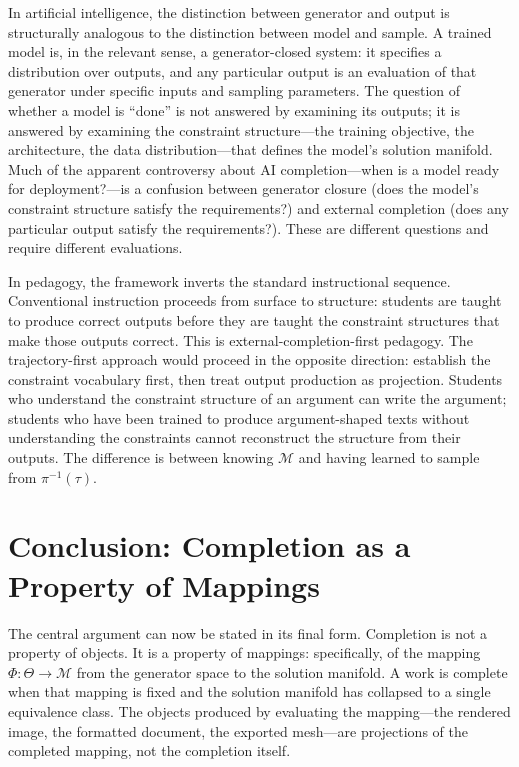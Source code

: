 \documentclass[12pt, twoside]{article}
\theoremstyle{plain}
\theoremstyle{definition}
\theoremstyle{remark}
\begin{document}
In artificial intelligence, the distinction between generator and output is structurally analogous to the distinction between model and sample. A trained model is, in the relevant sense, a generator-closed system: it specifies a distribution over outputs, and any particular output is an evaluation of that generator under specific inputs and sampling parameters. The question of whether a model is ``done'' is not answered by examining its outputs; it is answered by examining the constraint structure---the training objective, the architecture, the data distribution---that defines the model's solution manifold. Much of the apparent controversy about AI completion---when is a model ready for deployment?---is a confusion between generator closure (does the model's constraint structure satisfy the requirements?) and external completion (does any particular output satisfy the requirements?). These are different questions and require different evaluations.

In pedagogy, the framework inverts the standard instructional sequence. Conventional instruction proceeds from surface to structure: students are taught to produce correct outputs before they are taught the constraint structures that make those outputs correct. This is external-completion-first pedagogy. The trajectory-first approach would proceed in the opposite direction: establish the constraint vocabulary first, then treat output production as projection. Students who understand the constraint structure of an argument can write the argument; students who have been trained to produce argument-shaped texts without understanding the constraints cannot reconstruct the structure from their outputs. The difference is between knowing $\mathcal{M}$ and having learned to sample from $\pi^{-1}(\tau)$.

\section{Conclusion: Completion as a Property of Mappings}
\label{sec:conclusion}

The central argument can now be stated in its final form. Completion is not a property of objects. It is a property of mappings: specifically, of the mapping $\Phi : \Theta \to \mathcal{M}$ from the generator space to the solution manifold. A work is complete when that mapping is fixed and the solution manifold has collapsed to a single equivalence class. The objects produced by evaluating the mapping---the rendered image, the formatted document, the exported mesh---are projections of the completed mapping, not the completion itself.
\end{document}
